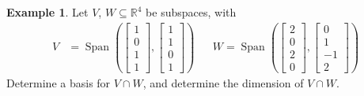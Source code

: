 \documentclass[letterpaper,12pt]{article}
\theoremstyle{definition}
\newtheorem*{example}{Example}
\DeclareMathOperator{\Span}{Span}
\begin{document}
\begin{example}
Let $V$, $W \subseteq \mathbb{R}^4$ be subspaces, with
\begin{align*}
    V & = \Span{\left(\begin{bmatrix} 1 \\ 0 \\ 1 \\ 1 \end{bmatrix}, \begin{bmatrix} 1 \\ 1 \\ 0 \\ 1 \end{bmatrix} \right)} && W = \Span{\left(\begin{bmatrix} 2 \\ 0 \\ 2 \\ 0 \end{bmatrix}, \begin{bmatrix} 0 \\ 1 \\ -1 \\ 2 \end{bmatrix} \right)}
\end{align*}
Determine a basis for $V \cap W$, and determine the dimension of $V \cap W$.
\end{example}
\end{document}
